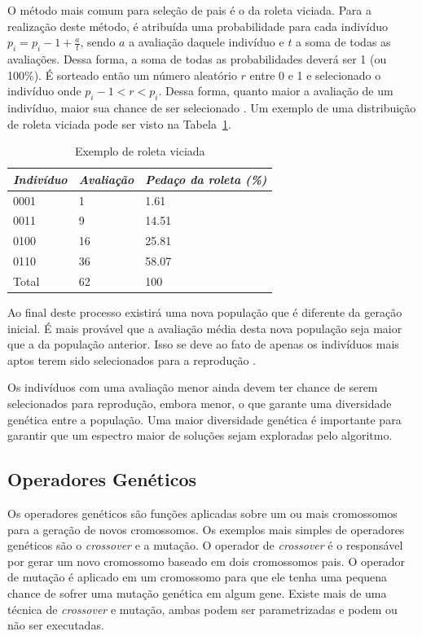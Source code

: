 \documentclass[12pt,oneside,a4paper,english,french,spanish,brazil,]{abntex2}
\begin{document}
O método mais comum para seleção de pais é o da roleta viciada. Para a realização deste método, é atribuída uma probabilidade para cada indivíduo \(p_i = p_i-1 + \frac{a}{t}\), sendo \(a\) a avaliação daquele indivíduo e \(t\) a soma de todas as avaliações. Dessa forma, a soma de todas as probabilidades deverá ser 1 (ou 100\%). É sorteado então um número aleatório \(r\) entre 0 e 1 e selecionado o indivíduo onde \(p_i-1 < r < p_i\). Dessa forma, quanto maior a avaliação de um indivíduo, maior sua chance de ser selecionado \cite{linden:2008}. Um exemplo de uma distribuição de roleta viciada pode ser visto na Tabela~\ref{tab:Roleta}.

\begin{table}
\centering
\caption{Exemplo de roleta viciada}
\label{tab:Roleta}
\begin{tabular}{lll}
\hline
\textit{\textbf{Indivíduo}} & \textit{\textbf{Avaliação}} & \textit{\textbf{Pedaço da roleta (\%)}} \\ \hline
0001      & 1         & 1.61                  \\
0011      & 9         & 14.51                 \\ 
0100      & 16        & 25.81                 \\ 
0110      & 36        & 58.07                 \\ 
Total     & 62        & 100                   \\ \hline
\end{tabular}
\end{table}

Ao final deste processo existirá uma nova população que é diferente da geração inicial. É mais provável que a avaliação média desta nova população seja maior que a da população anterior. Isso se deve ao fato de apenas os indivíduos mais aptos terem sido selecionados para a reprodução \cite{linden:2008}.

Os indivíduos com uma avaliação menor ainda devem ter chance de serem selecionados para reprodução, embora menor, o que garante uma diversidade genética entre a população. Uma maior diversidade genética é importante para garantir que um espectro maior de soluções sejam exploradas pelo algoritmo.

\subsection{Operadores Genéticos}

Os operadores genéticos são funções aplicadas sobre um ou mais cromossomos para a geração de novos cromossomos. Os exemplos mais simples de operadores genéticos são o \textit{crossover} e a mutação. O operador de \textit{crossover} é o responsável por gerar um novo cromossomo baseado em dois cromossomos pais. O operador de mutação é aplicado em um cromossomo para que ele tenha uma pequena chance de sofrer uma mutação genética em algum gene. Existe mais de uma técnica de \textit{crossover} e mutação, ambas podem ser parametrizadas e podem ou não ser executadas.
\end{document}
